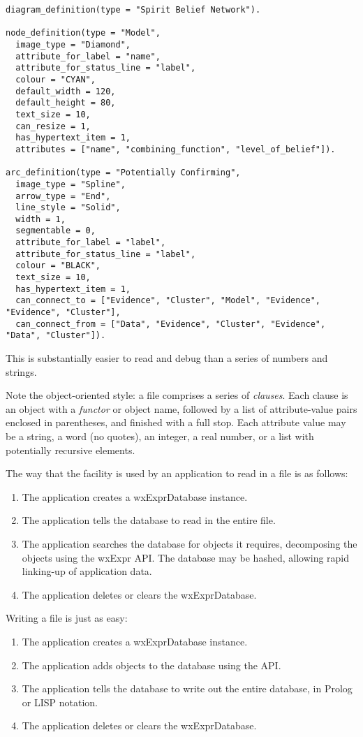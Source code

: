 \begin{verbatim}
diagram_definition(type = "Spirit Belief Network").

node_definition(type = "Model",
  image_type = "Diamond",
  attribute_for_label = "name",
  attribute_for_status_line = "label",
  colour = "CYAN",
  default_width = 120,
  default_height = 80,
  text_size = 10,
  can_resize = 1,
  has_hypertext_item = 1,
  attributes = ["name", "combining_function", "level_of_belief"]).

arc_definition(type = "Potentially Confirming",
  image_type = "Spline",
  arrow_type = "End",
  line_style = "Solid",
  width = 1,
  segmentable = 0,
  attribute_for_label = "label",
  attribute_for_status_line = "label",
  colour = "BLACK",
  text_size = 10,
  has_hypertext_item = 1,
  can_connect_to = ["Evidence", "Cluster", "Model", "Evidence", "Evidence", "Cluster"],
  can_connect_from = ["Data", "Evidence", "Cluster", "Evidence", "Data", "Cluster"]).
\end{verbatim}

This is substantially easier to read and debug than a series of numbers and
strings.

Note the object-oriented style: a file comprises a series of {\it clauses}.
Each clause is an object with a {\it functor}\/ or object name, followed
by a list of attribute-value pairs enclosed in parentheses, and finished
with a full stop.  Each attribute value may be a string, a word (no quotes),
an integer, a real number, or a list with potentially recursive elements.

The way that the facility is used by an application to read in a file is
as follows:

\begin{enumerate}\itemsep=0pt
\item The application creates a wxExprDatabase instance.
\item The application tells the database to read in the entire file.
\item The application searches the database for objects it requires,
decomposing the objects using the wxExpr API. The database may be hashed,
allowing rapid linking-up of application data.
\item The application deletes or clears the wxExprDatabase.
\end{enumerate}

Writing a file is just as easy:

\begin{enumerate}\itemsep=0pt
\item The application creates a wxExprDatabase instance.
\item The application adds objects to the database using the API.
\item The application tells the database to write out the entire database,
in Prolog or LISP notation.
\item The application deletes or clears the wxExprDatabase.
\end{enumerate}

